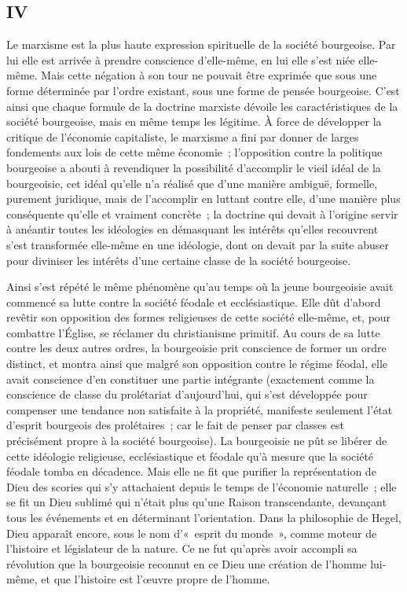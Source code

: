 \documentclass[french,twoside]{book} %
\begin{document}
\subsection[{IV}]{IV}
\noindent Le marxisme est la plus haute expression spirituelle de la société bourgeoise. Par lui elle est arrivée à prendre conscience d'elle-même, en lui elle s'est niée elle-même. Mais cette négation à son tour ne pouvait être exprimée que sous une forme déterminée par l'ordre existant, sous une forme de pensée bourgeoise. C'est ainsi que chaque formule de la doctrine marxiste dévoile les caractéristiques de la société bourgeoise, mais en même temps les légitime. À force de développer la critique de l'économie capitaliste, le marxisme a fini par donner de larges fondements aux lois de cette même économie ; l'opposition contre la politique bourgeoise a abouti à revendiquer la possibilité d'accomplir le vieil idéal de la bourgeoisie, cet idéal qu'elle n'a réalisé que d'une manière ambiguë, formelle, purement juridique, mais de l'accomplir en luttant contre elle, d'une manière plus conséquente qu'elle et vraiment concrète ; la doctrine qui devait à l'origine servir à anéantir toutes les idéologies en démasquant les intérêts qu'elles recouvrent s'est transformée elle-même en une idéologie, dont on devait par la suite abuser pour diviniser les intérêts d'une certaine classe de la société bourgeoise.\par
Ainsi s'est répété le même phénomène qu'au temps où la jeune bourgeoisie avait commencé sa lutte contre la société féodale et ecclésiastique. Elle dût d'abord revêtir son opposition des formes religieuses de cette société elle-même, et, pour combattre l'Église, se réclamer du christianisme primitif. Au cours de sa lutte contre les deux autres ordres, la bourgeoisie prit conscience de former un ordre distinct, et montra ainsi que malgré son opposition contre le régime féodal, elle avait conscience d'en constituer une partie intégrante (exactement comme la conscience de classe du prolétariat d'aujourd'hui, qui s'est développée pour compenser une tendance non satisfaite à la propriété, manifeste seulement l'état d'esprit bourgeois des prolétaires ; car le fait de penser par classes est précisément propre à la société bourgeoise). La bourgeoisie ne pût se libérer de cette idéologie religieuse, ecclésiastique et féodale qu'à mesure que la société féodale tomba en décadence. Mais elle ne fit que purifier la représentation de Dieu des scories qui s'y attachaient depuis le temps de l'économie naturelle ; elle se fit un Dieu sublimé qui n'était plus qu'une Raison transcendante, devançant tous les événements et en déterminant l'orientation. Dans la philosophie de Hegel, Dieu apparaît encore, sous le nom d’« esprit du monde », comme moteur de l'histoire et législateur de la nature. Ce ne fut qu'après avoir accompli sa révolution que la bourgeoisie reconnut en ce Dieu une création de l'homme lui-même, et que l'histoire est l'œuvre propre de l'homme.\par
\end{document}
